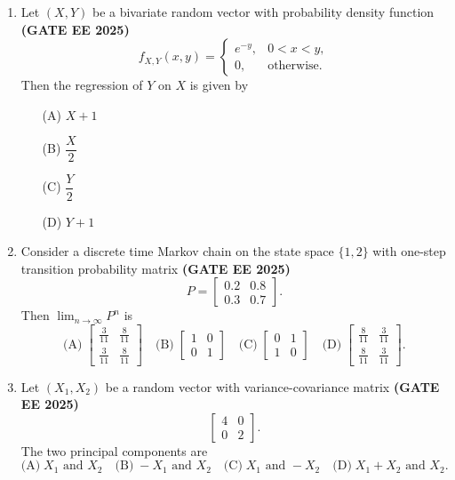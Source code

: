 \documentclass[journal,12pt,onecolumn]{IEEEtran}
\theoremstyle{remark}
\begin{document}
\begin{enumerate}
\item Let $(X, Y)$ be a bivariate random vector with probability density function \hfill \textbf{(GATE EE 2025)}\\
\[
f_{X,Y}(x,y) = 
\begin{cases}
e^{-y}, & 0 < x < y, \\
0, & \text{otherwise}.
\end{cases}
\]
Then the regression of $Y$ on $X$ is given by
\begin{enumerate}
    \item[(A)] $X+1$
    \item[(B)] $\dfrac{X}{2}$
    \item[(C)] $\dfrac{Y}{2}$
    \item[(D)] $Y+1$
\end{enumerate}
\item Consider a discrete time Markov chain on the state space $\{1,2\}$ with one-step transition probability matrix \hfill \textbf{(GATE EE 2025)}\\
\[
P = \begin{bmatrix}
0.2 & 0.8 \\
0.3 & 0.7
\end{bmatrix}.
\]
Then $\lim_{n \to \infty} P^n$ is
\[
\text{(A)} \; \begin{bmatrix}
\frac{3}{11} & \frac{8}{11} \\
\frac{3}{11} & \frac{8}{11}
\end{bmatrix} 
\quad
\text{(B)} \; \begin{bmatrix}
1 & 0 \\
0 & 1
\end{bmatrix}
\quad
\text{(C)} \; \begin{bmatrix}
0 & 1 \\
1 & 0
\end{bmatrix}
\quad
\text{(D)} \; \begin{bmatrix}
\frac{8}{11} & \frac{3}{11} \\
\frac{8}{11} & \frac{3}{11}
\end{bmatrix}.
\]

\item Let $(X_1, X_2)$ be a random vector with variance-covariance matrix  \hfill \textbf{(GATE EE 2025)}\\
\[
\begin{bmatrix}
4 & 0 \\
0 & 2
\end{bmatrix}.
\]
The two principal components are
\[
\text{(A)} \; X_1 \text{ and } X_2 
\quad
\text{(B)} \; -X_1 \text{ and } X_2
\quad
\text{(C)} \; X_1 \text{ and } -X_2
\quad
\text{(D)} \; X_1+X_2 \text{ and } X_2.
\]


\end{enumerate}
\end{document}
